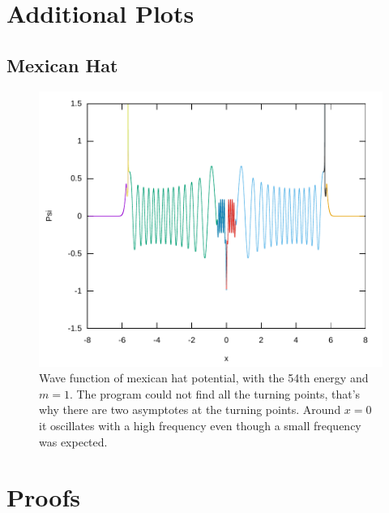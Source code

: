 \documentclass[11pt,DIV=10,final]{scrreprt} %
\begin{document}
\begin{appendix}
{\section{Additional Plots}
\subsection{Mexican Hat}
\begin{figure}[H]
  \centering
    \includegraphics[width=\textwidth]{plots/mexican-hat-54.pdf}
    \caption{
      Wave function of mexican hat potential, with the 54th energy and $m = 1$. The program could not find all the turning points, that's why there are two asymptotes at the turning points.
      Around $x = 0$ it oscillates with a high frequency even though a small frequency was expected.
    }\label{fig:mexican-hat-54th-energy}
\end{figure}


\section{Proofs}
}
\end{appendix}
\end{document}
